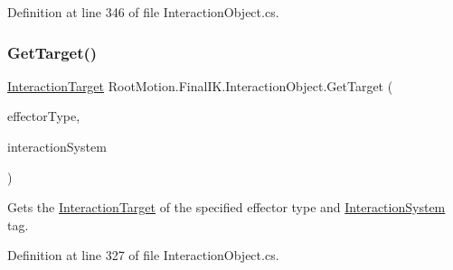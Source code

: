 Definition at line 346 of file Interaction\+Object.\+cs.

\mbox{\label{class_root_motion_1_1_final_i_k_1_1_interaction_object_a946e3d9232fa533ef0c246eecb8ccbb5}} 
\subsubsection{\texorpdfstring{Get\+Target()}{GetTarget()}\hspace{0.1cm}{\footnotesize\ttfamily [1/2]}}
{\footnotesize\ttfamily \mbox{\hyperlink{class_root_motion_1_1_final_i_k_1_1_interaction_target}{Interaction\+Target}} Root\+Motion.\+Final\+I\+K.\+Interaction\+Object.\+Get\+Target (\begin{DoxyParamCaption}\item[{\mbox{\hyperlink{namespace_root_motion_1_1_final_i_k_ae0dd2058c7667b6f132c11a6b860c14a}{Full\+Body\+Biped\+Effector}}}]{effector\+Type,  }\item[{\mbox{\hyperlink{class_root_motion_1_1_final_i_k_1_1_interaction_system}{Interaction\+System}}}]{interaction\+System }\end{DoxyParamCaption})}



Gets the \mbox{\hyperlink{class_root_motion_1_1_final_i_k_1_1_interaction_target}{Interaction\+Target}} of the specified effector type and \mbox{\hyperlink{class_root_motion_1_1_final_i_k_1_1_interaction_system}{Interaction\+System}} tag. 



Definition at line 327 of file Interaction\+Object.\+cs.

\mbox{\label{class_root_motion_1_1_final_i_k_1_1_interaction_object_a24037892e4871633a3ad3ba72e7a0d0f}} 
